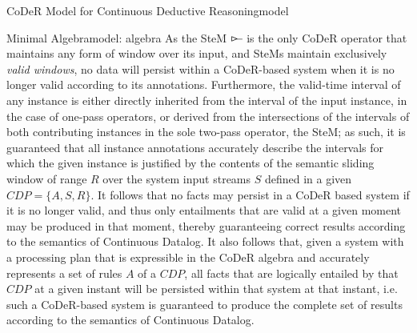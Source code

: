 \begin{nestedsection}{CoDeR Model for Continuous Deductive Reasoning}{model}
\begin{nestedsection}{Minimal Algebra}{model: algebra}
		As the SteM $\rstreamjoin$ is the only CoDeR operator that maintains any form of window over its input, and SteMs maintain exclusively \emph{valid windows}, no data will persist within a CoDeR-based system when it is no longer valid according to its annotations.
		Furthermore, the valid-time interval of any instance is either directly inherited from the interval of the input instance, in the case of one-pass operators, or derived from the intersections of the intervals of both contributing instances in the sole two-pass operator, the SteM;
		as such, it is guaranteed that all instance annotations accurately describe the intervals for which the given instance is justified by the contents of the semantic sliding window of range $R$ over the system input streams $S$ defined in a given ${CDP = \{A,S,R\}}$.
		It follows that no facts may persist in a CoDeR based system if it is no longer valid, and thus only entailments that are valid at a given moment may be produced in that moment, thereby guaranteeing correct results according to the semantics of Continuous Datalog.
		It also follows that, given a system with a processing plan that is expressible in the CoDeR algebra and accurately represents a set of rules $A$ of a ${CDP}$, all facts that are logically entailed by that ${CDP}$ at a given instant will be persisted within that system at that instant,
		i.e. such a CoDeR-based system is guaranteed to produce the complete set of results according to the semantics of Continuous Datalog.
	\end{nestedsection}

\end{nestedsection}